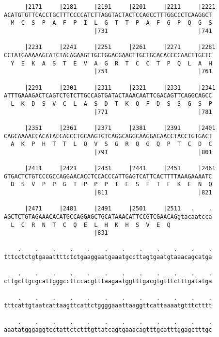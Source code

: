 \documentclass{article}
\begin{document}
\begin{Verbatim}
      |2171     |2181     |2191     |2201     |2211     |2221
ACATGTGTTCACCTGCTTTCCCCATCTTAGGTACTACTCCAGCCTTTGGCCCTCAAGGCT
  M  C  S  P  A  F  P  I  L  G  T  T  P  A  F  G  P  Q  G  S
                          |731                          |741
  
      |2231     |2241     |2251     |2261     |2271     |2281
CCTATGAAAAAGCATCTACAGAAGTTGCTGGACGAACTTGCTGCACACCCCAACTTGCTC
  Y  E  K  A  S  T  E  V  A  G  R  T  C  C  T  P  Q  L  A  H
                          |751                          |761
  
      |2291     |2301     |2311     |2321     |2331     |2341
ATTTGAAAGACTCAGTCTGTCTTGCCAGTGATACTAAACAATTCGACAGTTCAGGCAGCC
  L  K  D  S  V  C  L  A  S  D  T  K  Q  F  D  S  S  G  S  P
                          |771                          |781
  
      |2351     |2361     |2371     |2381     |2391     |2401
CAGCAAAACCACATACCACCCTGCAAGTGTCAGGCAGGCAAGGACAACCTACCTGTGACT
  A  K  P  H  T  T  L  Q  V  S  G  R  Q  G  Q  P  T  C  D  C
                          |791                          |801
  
      |2411     |2421     |2431     |2441     |2451     |2461
GTGACTCTGTCCCGCCAGGAACACCTCCACCCATTGAGTCATTCACTTTTAAAGAAAATC
  D  S  V  P  P  G  T  P  P  P  I  E  S  F  T  F  K  E  N  Q
                          |811                          |821
  
      |2471     |2481     |2491     |2501     |2511   .    .
AGCTCTGTAGAAACACATGCCAGGAGCTGCATAAACATTCCGTCGAACAGgtacaatcca
  L  C  R  N  T  C  Q  E  L  H  K  H  S  V  E  Q            
                          |831                              
  
    .    .    .    .    .    .    .    .    .    .    .    .
tttcctctgtgaaattttctctgaaggaatgaaatgccttagtgaatgtaaacagcatga
                                                            
    .    .    .    .    .    .    .    .    .    .    .    .
cttgcttgcgcattgggccttccacgtttaagaatggtttgacgtgtttctttgatatga
                                                            
    .    .    .    .    .    .    .    .    .    .    .    .
tttcattgtaatcattaagttcattctggggaaattaaggttcattaaaatgtttctttt
                                                            
    .    .    .    .    .    .    .    .    .    .    .    .
aaatatgggaggtcctattctctttgttatcagtgaaacagtttgcatttggagctttgc
                                                            

\end{Verbatim}
\end{document}
